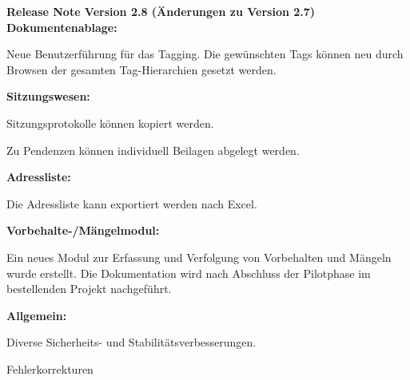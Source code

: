 \vspace{\baselineskip}

\textbf{Release Note Version 2.8 (Änderungen zu Version 2.7)} \\
\textbf{Dokumentenablage:}
\begin{compactitem}
	\item Neue Benutzerführung für das Tagging. Die gewünschten Tags können neu durch Browsen der gesamten Tag-Hierarchien gesetzt werden.
\end{compactitem}
\textbf{Sitzungswesen:}
\begin{compactitem}
	\item Sitzungsprotokolle können kopiert werden.
	\item Zu Pendenzen können individuell Beilagen abgelegt werden.
\end{compactitem}
\textbf{Adressliste:}
\begin{compactitem}
	\item Die Adressliste kann exportiert werden nach Excel.
\end{compactitem}
\textbf{Vorbehalte-/Mängelmodul:}
\begin{compactitem}
	\item Ein neues Modul zur Erfassung und Verfolgung von Vorbehalten und Mängeln wurde erstellt. Die Dokumentation wird nach Abschluss der Pilotphase im bestellenden Projekt nachgeführt.
\end{compactitem}
\textbf{Allgemein:}
\begin{compactitem}
	\item Diverse Sicherheits- und Stabilitätsverbesserungen.
	\item Fehlerkorrekturen
\end{compactitem}
\vspace{\baselineskip}

